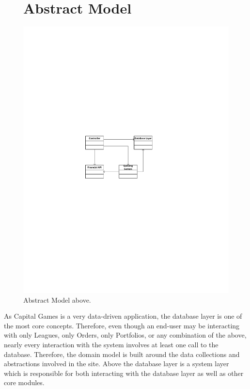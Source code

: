 \begin{figure}
\section{Abstract Model}
\centering
\includegraphics[width=6.5in]{./img/AbstractModel.pdf}
\caption{Abstract Model above.}
\end{figure}

As Capital Games is a very data-driven application, the database layer is
one of the most core concepts. Therefore, even though an end-user may
be interacting with only Leagues, only Orders, only Portfolios, or any
combination of the above, nearly every interaction with the system
involves at least one call to the database. Therefore, the domain model
is built around the data collections and abstractions involved in the site.
Above the database layer is a system layer which is responsible for both
interacting with the database layer as well as other core modules. \\

